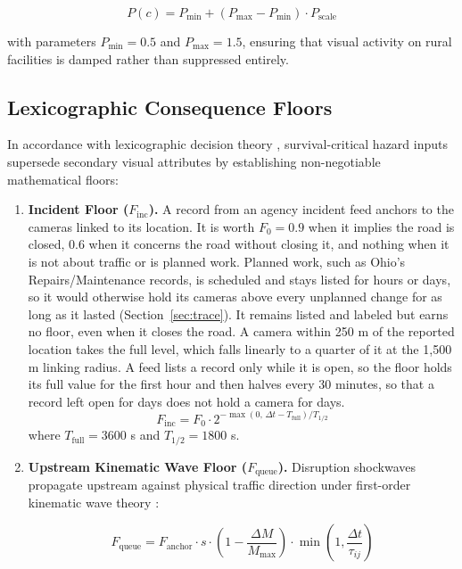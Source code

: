 \documentclass[10pt,journal,compsoc]{IEEEtran}
\begin{document}
\begin{equation}
P(c) = P_{\min} + (P_{\max} - P_{\min}) \cdot P_{\text{scale}}
\end{equation}

\noindent with parameters $P_{\min} = 0.5$ and $P_{\max} = 1.5$, ensuring that visual activity on rural facilities is damped rather than suppressed entirely.

\subsection{Lexicographic Consequence Floors}
In accordance with lexicographic decision theory \cite{fishburn1974}, survival-critical hazard inputs supersede secondary visual attributes by establishing non-negotiable mathematical floors:

\begin{enumerate}
    \item \textbf{Incident Floor ($F_{\text{inc}}$).} A record from an agency incident feed anchors to the cameras linked to its location. It is worth $F_0 = 0.9$ when it implies the road is closed, $0.6$ when it concerns the road without closing it, and nothing when it is not about traffic or is planned work. Planned work, such as Ohio's Repairs/Maintenance records, is scheduled and stays listed for hours or days, so it would otherwise hold its cameras above every unplanned change for as long as it lasted (Section~\ref{sec:trace}). It remains listed and labeled but earns no floor, even when it closes the road. A camera within 250 m of the reported location takes the full level, which falls linearly to a quarter of it at the 1,500 m linking radius. A feed lists a record only while it is open, so the floor holds its full value for the first hour and then halves every 30 minutes, so that a record left open for days does not hold a camera for days.
    \begin{equation}
    F_{\text{inc}} = F_0 \cdot 2^{-\max(0,\, \Delta t - T_{\text{full}}) / T_{1/2}}
    \end{equation}
    where $T_{\text{full}} = 3600$ s and $T_{1/2} = 1800$ s.
    
    \item \textbf{Upstream Kinematic Wave Floor ($F_{\text{queue}}$).} Disruption shockwaves propagate upstream against physical traffic direction under first-order kinematic wave theory \cite{lighthill1955, richards1956}:
    
    \begin{equation}
    F_{\text{queue}} = F_{\text{anchor}} \cdot s \cdot \left(1 - \frac{\Delta M}{M_{\max}}\right) \cdot \min\left(1, \frac{\Delta t}{\tau_{ij}}\right)
    \end{equation}
    

\end{enumerate}
\end{document}
